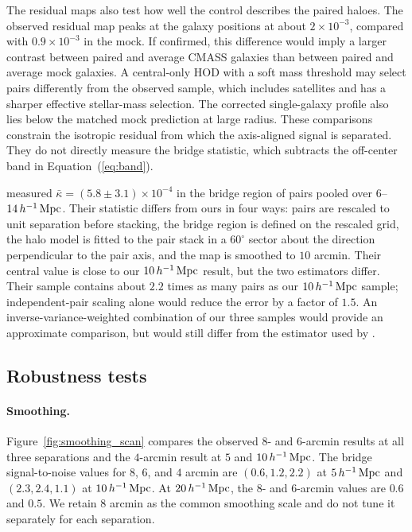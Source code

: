 The residual maps also test how well the control describes the paired haloes.
The observed residual map peaks at the galaxy positions at about
$2\times10^{-3}$, compared with $0.9\times10^{-3}$ in the mock.
If confirmed, this difference would imply a larger contrast between paired
and average CMASS galaxies than between paired and average mock galaxies. A
central-only HOD with a soft mass threshold may select pairs differently from
the observed sample, which includes satellites and has a sharper effective
stellar-mass selection. The corrected single-galaxy profile also lies below
the matched mock prediction at large radius.
These comparisons constrain the isotropic residual from which the
axis-aligned signal is separated. They do not directly measure the bridge
statistic, which subtracts the off-center band in Equation~(\ref{eq:band}).

\citet{deGraaff2019} measured
$\bar\kappa=(5.8\pm3.1)\times10^{-4}$ in the bridge region of pairs pooled
over $6$--$14\,h^{-1}\,{\rm Mpc}$. Their statistic differs from ours in four ways:
pairs are rescaled to unit separation before stacking, the bridge region is
defined on the rescaled grid, the halo model is fitted to the pair stack in
a $60^\circ$ sector about the direction perpendicular to the pair axis, and
the map is smoothed to $10$ arcmin. Their central value is close to our
$10\,h^{-1}\,{\rm Mpc}$ result, but the two estimators differ. Their
sample contains about $2.2$ times as many pairs as our $10\,h^{-1}\,{\rm Mpc}$
sample; independent-pair scaling alone would reduce the error by a factor of
$1.5$.
An inverse-variance-weighted combination of our three samples would provide
an approximate comparison, but would still differ from the estimator used by
\citet{deGraaff2019}.

\subsection{Robustness tests}
\label{sec:robust}

\paragraph{Smoothing.} Figure~\ref{fig:smoothing_scan} compares the observed
$8$- and $6$-arcmin results at all three separations and the $4$-arcmin
result at $5$ and $10\,h^{-1}\,{\rm Mpc}$. The bridge signal-to-noise values for
$8$, $6$, and $4$ arcmin are $(0.6,1.2,2.2)$ at $5\,h^{-1}\,{\rm Mpc}$ and
$(2.3,2.4,1.1)$ at $10\,h^{-1}\,{\rm Mpc}$. At $20\,h^{-1}\,{\rm Mpc}$, the $8$- and
$6$-arcmin values are $0.6$ and $0.5$. We retain $8$ arcmin as the common
smoothing scale and do not tune it separately for each separation.

